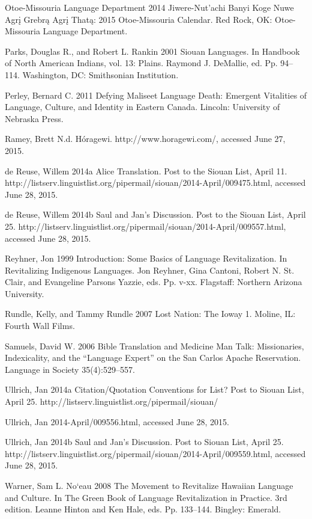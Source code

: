 \documentclass[output=paper]{LSP/langsci}
\begin{document}
\begin{reflist}
Otoe-Missouria Language Department 2014 Jiwere-Nut'achi Banyi Koge Nuwe Agr\k{i} Grebr\k{a} Agr\k{i} That\k{a}: 2015 Otoe-Missouria Calendar. Red Rock, OK: Otoe-Missouria Language Department.

Parks, Douglas R., and Robert L. Rankin 2001 Siouan Languages. In Handbook of North American Indians, vol. 13: Plains. Raymond J. DeMallie, ed. Pp. 94--114. Washington, DC: Smithsonian Institution.

Perley, Bernard C. 2011 Defying Maliseet Language Death: Emergent Vitalities of Language, Culture, and Identity in Eastern Canada. Lincoln: University of Nebraska Press.

Ramey, Brett N.d. Hóragewi. http://www.horagewi.com/, accessed June 27, 2015.

de Reuse, Willem 2014a Alice Translation. Post to the Siouan List, April 11. http://listserv.linguistlist.org/pipermail/siouan/2014-April/009475.html, accessed June 28, 2015.

de Reuse, Willem 2014b Saul and Jan's Discussion. Post to the Siouan List, April 25. http://listserv.linguistlist.org/pipermail/siouan/2014-April/009557.html, accessed June 28, 2015.

Reyhner, Jon 1999 Introduction: Some Basics of Language Revitalization. In Revitalizing Indigenous Languages. Jon Reyhner, Gina Cantoni, Robert N. St. Clair, and Evangeline Parsons Yazzie, eds. Pp. v-xx. Flagstaff: Northern Arizona University.

Rundle, Kelly, and Tammy Rundle 2007 Lost Nation: The Ioway 1. Moline, IL: Fourth Wall Films.

Samuels, David W. 2006 Bible Translation and Medicine Man Talk: Missionaries, Indexicality, and the ``Language Expert'' on the San Carlos Apache Reservation. Language in Society 35(4):529--557.

Ullrich, Jan 2014a Citation/Quotation Conventions for List? Post to Siouan List, April 25. http://listserv.linguistlist.org/pipermail/siouan/

Ullrich, Jan 2014-April/009556.html, accessed June 28, 2015.

Ullrich, Jan 2014b Saul and Jan's Discussion. Post to Siouan List, April 25. http://listserv.linguistlist.org/pipermail/siouan/2014-April/009559.html, accessed June 28, 2015.

Warner, Sam L. No`eau 2008 The Movement to Revitalize Hawaiian Language and Culture. In The Green Book of Language Revitalization in Practice. 3rd edition. Leanne Hinton and Ken Hale, eds. Pp. 133--144. Bingley: Emerald.


\end{reflist}
\end{document}
